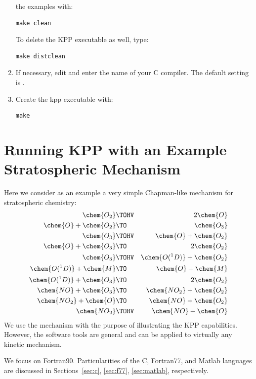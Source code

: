 \documentclass[twoside]{article}
\begin{document}
\begin{enumerate}
  the examples with:
\begin{verbatim}
make clean
\end{verbatim}
To delete the KPP executable as well, type:
\begin{verbatim}
make distclean
\end{verbatim}
\item If necessary, edit  and enter the name of your
  C compiler. The default setting is .
\item Create the kpp executable with:
\begin{verbatim}
make
\end{verbatim}
\end{enumerate}

\section{Running KPP with an Example Stratospheric Mechanism}
\label{sec:model}

Here we consider as an example a very simple Chapman-like mechanism for
stratospheric chemistry:
%
\begin{eqnarray}
\chem{O_2}                 & \TOHV & 2 \chem{O}\\
\chem{O} + \chem{O_2}      & \TO   & \chem{O_3}\\
\chem{O_3}                 & \TOHV & \chem{O} + \chem{O_2}\\
\chem{O} + \chem{O_3}      & \TO   & 2 \chem{O_2}\\
\chem{O_3}                 & \TOHV & \chem{O(^1D)} + \chem{O_2}\\
\chem{O(^1D)} + \chem{M}   & \TO   & \chem{O} + \chem{M}\\
\chem{O(^1D)} + \chem{O_3} & \TO   & 2 \chem{O_2}\\
\chem{NO} + \chem{O_3}     & \TO   & \chem{NO_2} + \chem{O_2}\\
\chem{NO_2} + \chem{O}     & \TO   & \chem{NO} + \chem{O_2}\\
\chem{NO_2}                & \TOHV & \chem{NO} + \chem{O}
\end{eqnarray}
%
We use the mechanism with the purpose of illustrating the KPP
capabilities. However, the software tools are general and can be applied
to virtually any kinetic mechanism.

We focus on Fortran90. Particularities of the C, Fortran77, and Matlab
languages are discussed in Sections~\ref{sec:c}, \ref{sec:f77},
\ref{sec:matlab}, respectively.
\end{document}
